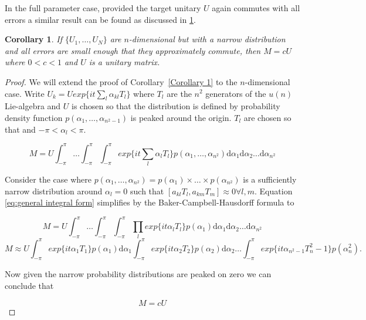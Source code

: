 \documentclass[aps,pra,twocolumn,superscriptaddress,numerical]{revtex4-1}
\newtheorem{corollary}{Corollary}
\begin{document}
In the full parameter case, provided the target unitary $U$ again commutes with all errors a similar result can be found as discussed in \ref{Corollary 2}.

\begin{corollary}
\label{Corollary 2}
	If $\{U_1,\ldots,U_N\}$ are $n$-dimensional but with a narrow distribution and all errors are small enough that they approximately commute, then $M = c U$ where $0 < c < 1$ and $U$ is a unitary matrix.
\end{corollary}
\begin{proof}
	We will extend the proof of Corollary~\ref{Corollary 1} to the $n$-dimensional case.  Write $U_k = U exp\{i t \sum_l \alpha_{kl} T_l\}$ where $T_l$ are the $n^2$ generators of the $u(n)$ Lie-algebra and $U$ is chosen so that the distribution is defined by probability density function $p(\alpha_1,\ldots,\alpha_{n^{2}-1})$ is peaked around the origin. $T_l$ are chosen so that and $-\pi < \alpha_l < \pi$.
\begin{widetext}
	\begin{equation}
		M = U
		\int^\pi_{-\pi} \ldots \int^\pi_{-\pi} \int^\pi_{-\pi}
		exp\{i t\sum_l \alpha_{l} T_l\} p(\alpha_1,\ldots,\alpha_{n^{2}})
		\mathrm{d}\alpha_1
		\mathrm{d}\alpha_2
		\ldots
		\mathrm{d}\alpha_{n^{2}} \label{eq:general integral form}
	\end{equation}
	\end{widetext}
	Consider the case where $p(\alpha_1,\ldots,\alpha_{n^{2}}) = p(\alpha_1)\times\ldots\times p(\alpha_{n^{2}})$ is a sufficiently narrow distribution around $\alpha_{l}=0$ such that $[a_{kl}T_{l},a_{km}T_{m}]\approx0 \forall l,m$. Equation \ref{eq:general integral form} simplifies by the Baker-Campbell-Hausdorff formula to
\begin{widetext}
	\begin{equation}
		M = U
		\int^\pi_{-\pi} \ldots \int^\pi_{-\pi} \int^\pi_{-\pi}
		\prod_{l}exp\{i t\alpha_{l} T_l\}p(\alpha_1)
		\mathrm{d}\alpha_1
		\mathrm{d}\alpha_2
		\ldots
		\mathrm{d}\alpha_{n^{2}}
	\end{equation}
	\begin{equation}
		M \approx U\int^\pi_{-\pi} exp\{i t\alpha_{1} T_1\}p(\alpha_1) \mathrm{d}\alpha_1 	\int^\pi_{-\pi} exp\{i t\alpha_{2} T_2\}p(\alpha_2) \mathrm{d}\alpha_2 \ldots \int^\pi_{-\pi}
		exp\{i t\alpha_{n^{2}-1} T_n^{2}-1\}p(\alpha_n^{2}).
	\end{equation}
\end{widetext}
	
	Now given the narrow probability distributions are peaked on zero we can conclude that

	\begin{equation}
		M = cU
	\end{equation}
\end{proof}
\end{document}
